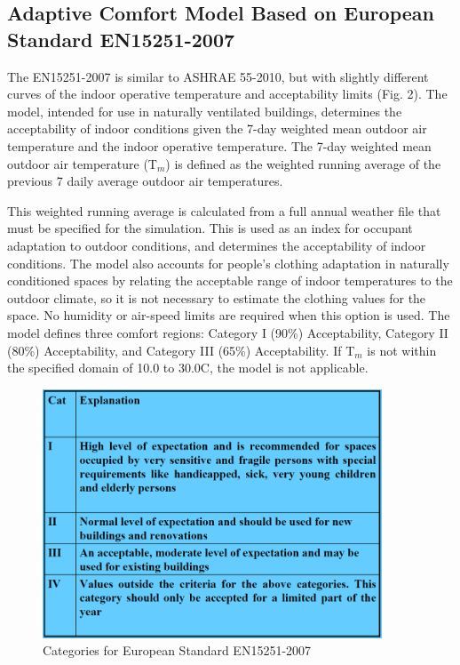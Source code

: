 \subsection{Adaptive Comfort Model Based on European Standard EN15251-2007}\label{adaptive-comfort-model-based-on-european-standard-en15251-2007}

The EN15251-2007 is similar to ASHRAE 55-2010, but with slightly different curves of the indoor operative temperature and acceptability limits (Fig. 2). The model, intended for use in naturally ventilated buildings, determines the acceptability of indoor conditions given the 7-day weighted mean outdoor air temperature and the indoor operative temperature. The 7-day weighted mean outdoor air temperature (T\(_{m}\)) is defined as the weighted running average of the previous 7 daily average outdoor air temperatures.

This weighted running average is calculated from a full annual weather file that must be specified for the simulation. This is used as an index for occupant adaptation to outdoor conditions, and determines the acceptability of indoor conditions. The model also accounts for people's clothing adaptation in naturally conditioned spaces by relating the acceptable range of indoor temperatures to the outdoor climate, so it is not necessary to estimate the clothing values for the space. No humidity or air-speed limits are required when this option is used. The model defines three comfort regions: Category I (90\%) Acceptability, Category II (80\%) Acceptability, and Category III (65\%) Acceptability. If T\(_{m}\) is not within the specified domain of 10.0 to 30.0C, the model is not applicable.

\begin{figure}[hbtp] %
\centering
\includegraphics[width=0.9\textwidth, height=0.9\textheight, keepaspectratio=true]{media/image6819.png}
\caption{Categories for European Standard EN15251-2007 \protect \label{fig:categories-for-european-standard-en15251-2007}}
\end{figure}


